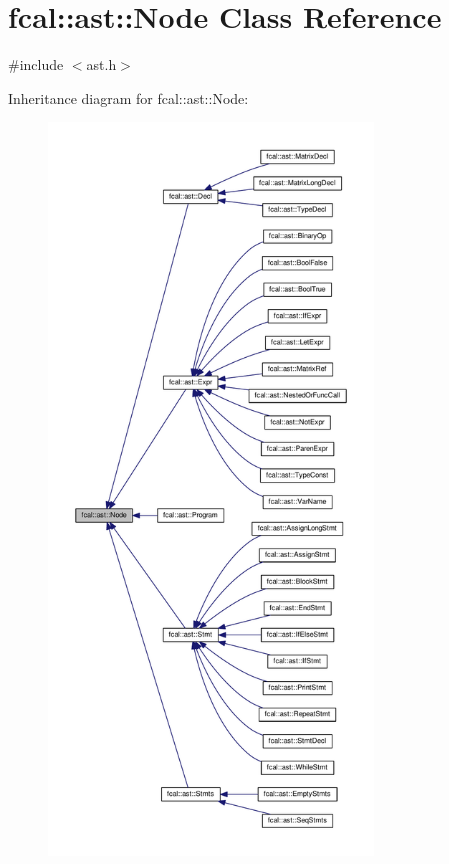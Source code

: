 \hypertarget{classfcal_1_1ast_1_1Node}{}\section{fcal\+:\+:ast\+:\+:Node Class Reference}
\label{classfcal_1_1ast_1_1Node}


{\ttfamily \#include $<$ast.\+h$>$}



Inheritance diagram for fcal\+:\+:ast\+:\+:Node\+:\nopagebreak
\begin{figure}[H]
\begin{center}
\leavevmode
\includegraphics[height=550pt]{classfcal_1_1ast_1_1Node__inherit__graph}
\end{center}
\end{figure}
